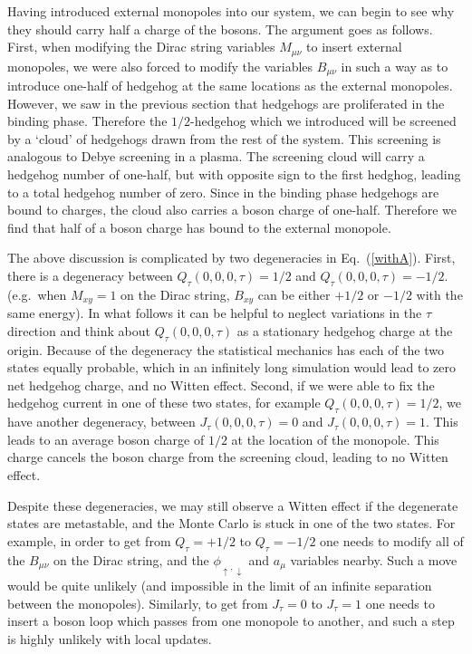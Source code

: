 \documentclass[prb,twocolumn]{revtex4-1}
\begin{document}
Having introduced external monopoles into our system, we can begin to see why they should carry half a charge of the bosons. 
The argument goes as follows. First, when modifying the Dirac string variables $M_{\mu\nu}$ to insert external monopoles, we were also forced to modify the variables $B_{\mu\nu}$ in such a way as to introduce one-half of hedgehog at the same locations as the external monopoles. However, we saw in the previous section that hedgehogs are proliferated in the binding phase. Therefore the $1/2$-hedgehog which we introduced will be screened by a `cloud' of hedgehogs drawn from the rest of the system. This screening is analogous to Debye screening in a plasma. The screening cloud will carry a hedgehog number of one-half, but with opposite sign to the first hedghog, leading to a total hedgehog number of zero. Since in the binding phase hedgehogs are bound to charges, the cloud also carries a boson charge of one-half. Therefore we find that half of a boson charge has bound to the external monopole.

The above discussion is complicated by two degeneracies in Eq.~(\ref{withA}). First, there is a degeneracy between $Q_\tau(0,0,0,\tau)=1/2$ and $Q_\tau(0,0,0,\tau)=-1/2$.(e.g.~when $M_{xy}=1$ on the Dirac string, $B_{xy}$ can be either $+1/2$ or $-1/2$ with the same energy). In what follows it can be helpful to neglect variations in the $\tau$ direction and think about $Q_\tau(0,0,0,\tau)$ as a stationary hedgehog charge at the origin. Because of the degeneracy the statistical mechanics has each of the two states equally probable, which in an infinitely long simulation would lead to zero net hedgehog charge, and no Witten effect.
Second, if we were able to fix the hedgehog current in one of these two states, for example $Q_\tau(0,0,0,\tau) = 1/2$, we have another degeneracy, between $J_\tau(0,0,0,\tau) = 0$ and $J_\tau(0,0,0,\tau) = 1$. This leads to an average boson charge of $1/2$ at the location of the  monopole. This charge cancels the boson charge from the screening cloud, leading to no Witten effect. 

Despite these degeneracies, we may still observe a Witten effect if the degenerate states are metastable, and the Monte Carlo is stuck in one of the two states. For example, in order to get from $Q_\tau=+1/2$ to $Q_\tau=-1/2$ one needs to modify all of the $B_{\mu\nu}$ on the Dirac string, and the $\phi_{\uparrow,\downarrow}$ and $a_{\mu}$ variables nearby. Such a move would be quite unlikely (and impossible in the limit of an infinite separation between the monopoles). Similarly, to get from $J_\tau=0$ to $J_\tau=1$ one needs to insert a boson loop which passes from one monopole to another, and such a step is highly unlikely with local updates.
\end{document}
